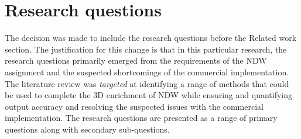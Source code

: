 
\chapter{Research questions}
\label{chap:rq}

The decision was made to include the research questions before the Related work section. The justification for this change is that in this particular research, the research questions primarily emerged from the requirements of the NDW assignment and the suspected shortcomings of the commercial implementation. The literature review was \textit{targeted} at identifying a range of methods that could be used to complete the 3D enrichment of NDW while ensuring and quantifying output accuracy and resolving the suspected issues with the commercial implementation. The research questions are presented as a range of primary questions along with secondary sub-questions.


